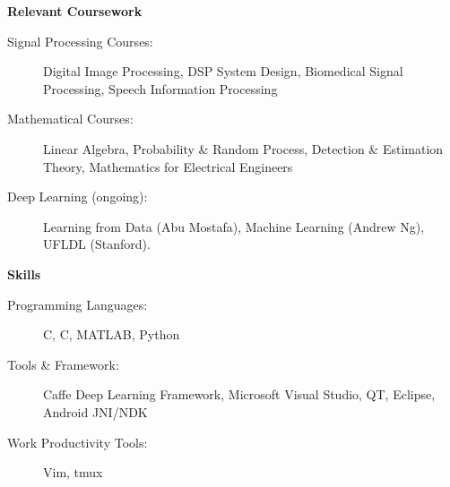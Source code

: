 \documentclass[letterpaper,11pt]{article}
\def\CC{{C\nolinebreak[4]\hspace{-.05em}\raisebox{.4ex}{\tiny\bf ++}}}
\newcommand{\resheading}[1]{{\large \colorbox{mygrey}{\begin{minipage}{\textwidth}{\textbf{#1 \vphantom{p\^{E}}}}\end{minipage}}}}
\begin{document}
\resheading{Relevant Coursework}
\begin{description}
	\item[Signal Processing Courses:]
		Digital Image Processing, DSP System Design, Biomedical Signal Processing, Speech Information Processing
	\item[Mathematical Courses:]
		Linear Algebra, Probability \& Random Process, Detection \& Estimation Theory, Mathematics for Electrical Engineers
	\item[Deep Learning (ongoing):]
		Learning from Data (Abu Mostafa), Machine Learning (Andrew Ng), UFLDL (Stanford).
\end{description}

\resheading{Skills}
\begin{description}
	\item[Programming Languages:]
		C, \CC, MATLAB, Python
	\item[Tools \& Framework:]
		Caffe Deep Learning Framework, Microsoft Visual Studio, QT, Eclipse, Android JNI/NDK
	\item[Work Productivity Tools:] Vim, tmux
\end{description}
\end{document}
